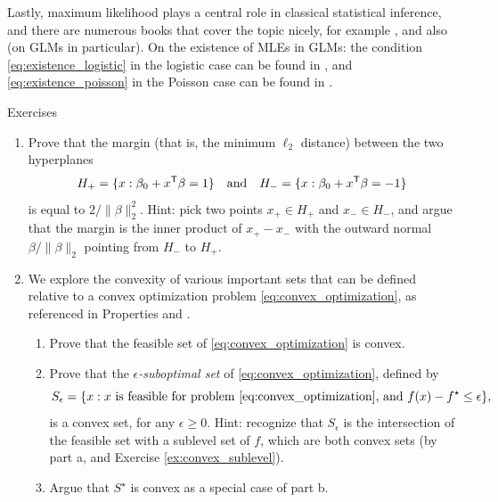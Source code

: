 Lastly, maximum likelihood plays a central role in classical statistical
inference, and there are numerous books that cover the topic nicely, for example
\cite{cox1974theoretical, silvey1975statistical, lehmann1998theory,
  wasserman2004all}, and also \cite{mccullaugh1989generalized} (on GLMs in
particular). On the existence of MLEs in GLMs: the condition
\eqref{eq:existence_logistic} in the logistic case can be found in
\cite{albert1984existence}, and \eqref{eq:existence_poisson} in the Poisson
case can be found in \cite{haberman1973log}. 

\clearpage

\begin{xcb}{Exercises}
\begin{enumerate}[label=\thechapter.\arabic*]
\settowidth{\leftmargini}{0.00.\hskip\labelsep}
\item \label{ex:svm_margin} 
  Prove that the margin (that is, the minimum $\ell_2$ distance) between the two
  hyperplanes  
  \[
  H_+ = \{x : \beta_0 + x^{\mathsf{T}} \beta = 1\} \quad \text{and} \quad 
  H_- = \{x : \beta_0 + x^{\mathsf{T}} \beta = -1\}
  \] 
  is equal to $2/\|\beta\|_2^2$. Hint: pick two points $x_+ \in H_+$ and
  $x_- \in H_-$, and argue that the margin is the inner product of $x_+-x_-$
  with the outward normal $\beta/\|\beta\|_2$ pointing from $H_-$ to $H_+$. 

\item \label{ex:convex_solution} 
  We explore the convexity of various important sets that can be defined
  relative to a convex optimization problem \eqref{eq:convex_optimization}, as
  referenced in Properties  and
  . 

\begin{enumerate}[label=\alph*.]
\item Prove that the feasible set of \eqref{eq:convex_optimization} is convex. 

\item Prove that the \emph{$\epsilon$-suboptimal set} of
  \eqref{eq:convex_optimization}, defined by 
  \[
  S_\epsilon = \{ x : \text{$x$ is feasible for problem
    \eqref{eq:convex_optimization}, and $f(x) - f^\star \leq \epsilon$} \},
  \]
  is a convex set, for any $\epsilon \geq 0$. Hint: recognize that $S_\epsilon$
  is the intersection of the feasible set with a sublevel set of $f$, which are
  both convex sets (by part a, and Exercise \ref{ex:convex_sublevel}). 

\item Argue that $S^\star$ is convex as a special case of part b.


\end{enumerate}
\end{enumerate}
\end{xcb}
